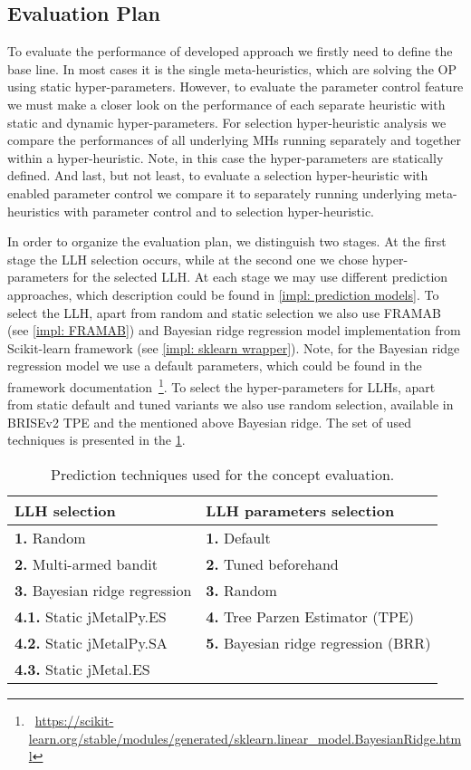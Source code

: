 \subsection{Evaluation Plan}\label{eval: concept plan}
To evaluate the performance of developed approach we firstly need to define the base line. In most cases it is the single meta-heuristics, which are solving the OP using static hyper-parameters. However, to evaluate the parameter control feature we must make a closer look on the performance of each separate heuristic with static and dynamic hyper-parameters. For selection hyper-heuristic analysis we compare the performances of all underlying MHs running separately and together within a hyper-heuristic. Note, in this case the hyper-parameters are statically defined. And last, but not least, to evaluate a selection hyper-heuristic with enabled parameter control we compare it to separately running underlying meta-heuristics with parameter control and to selection hyper-heuristic.

In order to organize the evaluation plan, we distinguish two stages.
At the first stage the LLH selection occurs, while at the second one we chose hyper-parameters for the selected LLH. At each stage we may use different prediction approaches, which description could be found in \cref{impl: prediction models}. To select the LLH, apart from random and static selection we also use FRAMAB (see \cref{impl: FRAMAB}) and Bayesian ridge regression model implementation from Scikit-learn framework (see \cref{impl: sklearn wrapper}). Note, for the Bayesian ridge regression model we use a default parameters, which could be found in the framework documentation~\footnote{~\url{https://scikit-learn.org/stable/modules/generated/sklearn.linear_model.BayesianRidge.html}}. To select the hyper-parameters for LLHs, apart from static default and tuned variants we also use random selection, available in BRISEv2 TPE and the mentioned above Bayesian ridge. The set of used techniques is presented in the \cref{eval: concept settings table}.
\begin{table}[h!]
	\centering
	\begin{tabular}{l||l}
		\textbf{LLH selection} & \textbf{LLH parameters selection} \\
		\hline
		\hline
		\textbf{1.} Random & \textbf{1.} Default \\
		\textbf{2.} Multi-armed bandit & \textbf{2.} Tuned beforehand \\
		\textbf{3.} Bayesian ridge regression & \textbf{3.} Random \\
		\textbf{4.1.} Static jMetalPy.ES & \textbf{4.} Tree Parzen Estimator (TPE) \\
		\textbf{4.2.} Static jMetalPy.SA & \textbf{5.} Bayesian ridge regression (BRR) \\
		\textbf{4.3.} Static jMetal.ES & 
	\end{tabular}
	
	\caption{Prediction techniques used for the concept evaluation.}
	\label{eval: concept settings table}
\end{table}


